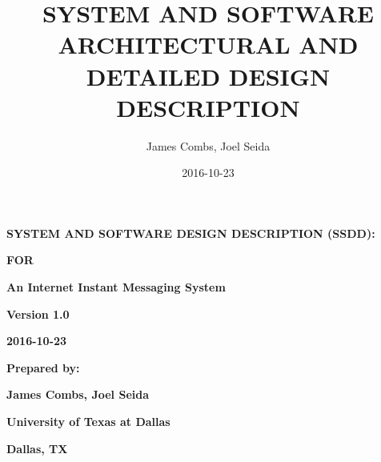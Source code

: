 \documentclass[twoside,letterpaper]{article}
\title{SYSTEM AND SOFTWARE ARCHITECTURAL AND DETAILED DESIGN DESCRIPTION}
\author{James Combs, Joel Seida}
\date{2016-10-23}
\begin{document}
\clearpage\setcounter{page}{1}\pagestyle{Standard}
\thispagestyle{FirstPage}

\bigskip

\clearpage

{\centering{}\bfseries\color{black}
SYSTEM AND SOFTWARE DESIGN DESCRIPTION (SSDD):
\par}

{\centering{}\bfseries\color{black}
FOR
\par}


\bigskip

{\centering{}\bfseries\color{black}
An Internet Instant Messaging System
\par}


\bigskip


\bigskip


\bigskip

{\centering \par}

\bigskip


\bigskip


\bigskip


\bigskip

{\centering{}\bfseries\color{black}
Version 1.0
\par}

{\centering{}\bfseries\color{black}
2016-10-23
\par}

\bigskip


\bigskip

{\centering{}\bfseries\color{black}
Prepared by:
\par}

{\centering{}\bfseries\color{black}
James Combs, Joel Seida
\par}

{\centering{}\bfseries\color{black}
University of Texas at Dallas
\par}

{\centering{}\bfseries\color{black}
Dallas, TX
\par}


\end{document}
